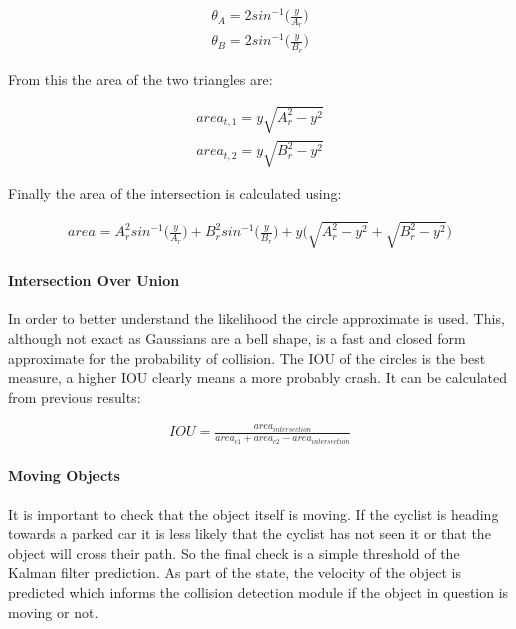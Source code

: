 \documentclass[11pt,twoside]{report}
\begin{document}
\begin{equation}
\begin{aligned}
\theta_{A} = 2sin^{-1} \bigg ( \frac{y}{A_{r}} \bigg )
\\
\theta_{B} = 2sin^{-1} \bigg ( \frac{y}{B_{r}} \bigg )
\end{aligned}
\label{circle_area_eq1}
\end{equation}

From this the area of the two triangles are:

\begin{equation}
\begin{aligned}
area_{t,1} = y \sqrt{A_{r}^{2} - y^{2}} \\
area_{t,2} = y \sqrt{B_{r}^{2} - y^{2}}
\end{aligned}
\label{circle_area_eq1}
\end{equation}


Finally the area of the intersection is calculated using:

\begin{equation}
\begin{aligned}
area = A_{r}^{2}sin^{-1} \big ( \frac{y}{A_{r}}) + B_{r}^{2}sin^{-1} \big ( \frac{y}{B_{r}}) + y \bigg ( \sqrt{A_{r}^{2} - y^{2}} + \sqrt{B_{r}^{2} - y^{2}} \bigg )
\end{aligned}
\label{circle_area_eq1}
\end{equation}

\paragraph{Intersection Over Union}
In order to better understand the likelihood the circle approximate is used. This, although not exact as Gaussians are a bell shape, is a fast and closed form approximate for the probability of collision. The IOU of the circles is the best measure, a higher IOU clearly means a more probably crash. It can be calculated from previous results:


\begin{equation}
\begin{aligned}
IOU = \frac{area_{intersection}}{ area_{c1} + area_{c2} - area_{intersection}}
\end{aligned}
\label{circle_area_eq1}
\end{equation}

\paragraph{Moving Objects}
It is important to check that the object itself is moving. If the cyclist is heading towards a parked car it is less likely that the cyclist has not seen it or that the object will cross their path. So the final check is a simple threshold of the Kalman filter prediction. As part of the state, the velocity of the object is predicted which informs the collision detection module if the object in question is moving or not.
\end{document}
